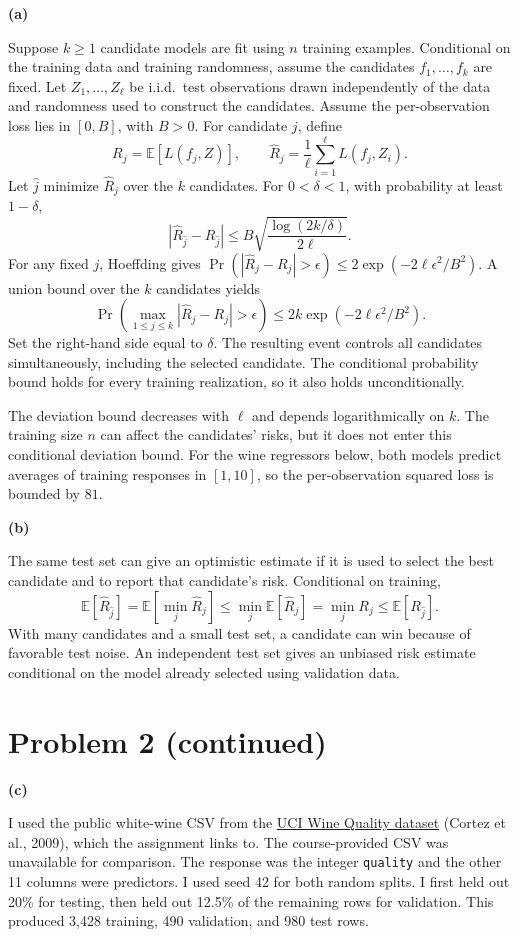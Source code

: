 \documentclass[11pt,letterpaper]{article}
\newcommand{\partlabel}[1]{\par\medskip\textbf{(#1)}\par}
\newcommand{\E}{\mathbb{E}}
\begin{document}
\partlabel{a}
Suppose \(k\geq 1\) candidate models are fit using \(n\) training examples.
Conditional on the training data and training randomness, assume the
candidates \(f_1,\ldots,f_k\) are fixed. Let \(Z_1,\ldots,Z_\ell\) be i.i.d.\ test
observations drawn independently of the data and randomness used to construct
the candidates. Assume the per-observation loss lies in \([0,B]\), with
\(B>0\). For candidate \(j\), define
\[
R_j=\E[L(f_j,Z)],\qquad
\widehat R_j=\frac{1}{\ell}\sum_{i=1}^{\ell}L(f_j,Z_i).
\]
Let \(\widehat j\) minimize \(\widehat R_j\) over the \(k\) candidates. For
\(0<\delta<1\), with probability at least \(1-\delta\),
\[
\left|\widehat R_{\widehat j}-R_{\widehat j}\right|
\leq B\sqrt{\frac{\log(2k/\delta)}{2\ell}}.
\]
For any fixed \(j\), Hoeffding gives
\(\Pr(|\widehat R_j-R_j|>\epsilon)
 \leq 2\exp(-2\ell\epsilon^2/B^2)\).
A union bound over the \(k\) candidates yields
\[
\Pr\!\left(\max_{1\leq j\leq k}|\widehat R_j-R_j|>\epsilon\right)
\leq 2k\exp(-2\ell\epsilon^2/B^2).
\]
Set the right-hand side equal to \(\delta\). The resulting event controls all
candidates simultaneously, including the selected candidate. The conditional
probability bound holds for every training realization, so it also holds
unconditionally.

The deviation bound decreases with \(\ell\) and depends logarithmically on
\(k\). The training size \(n\) can affect the candidates' risks, but it does not
enter this conditional deviation bound. For the wine regressors below, both
models predict averages of training responses in \([1,10]\), so the
per-observation squared loss is bounded by \(81\).

\partlabel{b}
The same test set can give an optimistic estimate if it is used to select the
best candidate and to report that candidate's risk. Conditional on training,
\[
\E[\widehat R_{\widehat j}]
=\E[\min_j\widehat R_j]
\leq\min_j\E[\widehat R_j]
=\min_jR_j
\leq\E[R_{\widehat j}].
\]
With many candidates and a small test set, a candidate can win because of
favorable test noise. An independent test set gives an unbiased risk estimate
conditional on the model already selected using validation data.

\clearpage
\section*{Problem 2 (continued)}

\partlabel{c}
I used the public white-wine CSV from the \href{https://doi.org/10.24432/C56S3T}{UCI Wine Quality dataset}
(Cortez et al., 2009), which the assignment links to. The course-provided CSV
was unavailable for comparison. The response was the integer \texttt{quality}
and the other 11 columns were predictors. I used seed 42 for both random splits.
I first held out 20\% for testing, then held out 12.5\% of the remaining rows
for validation. This produced 3,428 training, 490 validation, and 980 test rows.
\end{document}
